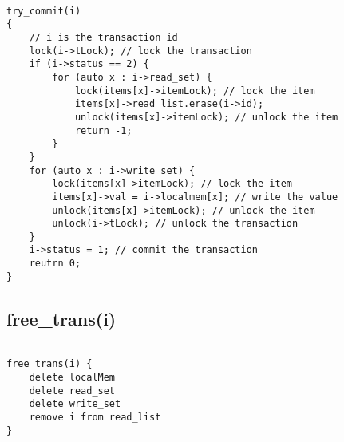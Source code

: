 \documentclass[12pt]{article}
\begin{document}
\begin{lstlisting}
    
try_commit(i)
{
    // i is the transaction id
    lock(i->tLock); // lock the transaction
    if (i->status == 2) {
        for (auto x : i->read_set) {
            lock(items[x]->itemLock); // lock the item
            items[x]->read_list.erase(i->id); 
            unlock(items[x]->itemLock); // unlock the item
            return -1;
        }
    }
    for (auto x : i->write_set) {
        lock(items[x]->itemLock); // lock the item
        items[x]->val = i->localmem[x]; // write the value
        unlock(items[x]->itemLock); // unlock the item
        unlock(i->tLock); // unlock the transaction
    }
    i->status = 1; // commit the transaction
    reutrn 0;
}

\end{lstlisting}

\subsection*{free\_trans(i)}

\begin{lstlisting}
    
free_trans(i) {
    delete localMem 
    delete read_set
    delete write_set
    remove i from read_list
}

\end{lstlisting}
\end{document}
